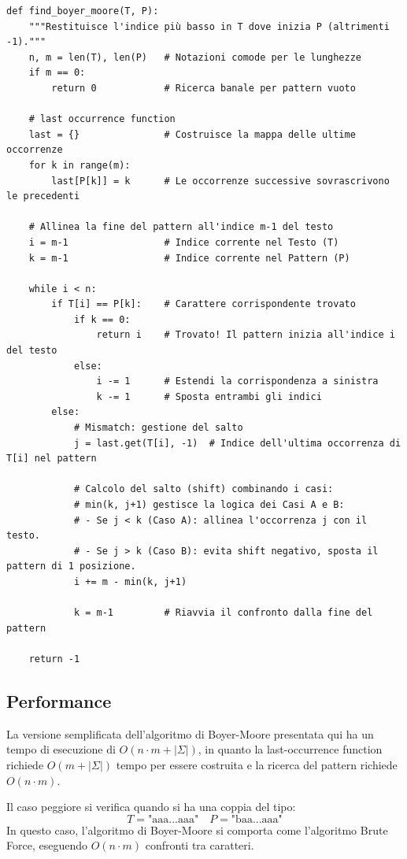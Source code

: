 \clearpage
\begin{lstlisting}
def find_boyer_moore(T, P):
    """Restituisce l'indice più basso in T dove inizia P (altrimenti -1)."""
    n, m = len(T), len(P)   # Notazioni comode per le lunghezze
    if m == 0:
        return 0            # Ricerca banale per pattern vuoto
    
    # last occurrence function
    last = {}               # Costruisce la mappa delle ultime occorrenze
    for k in range(m):
        last[P[k]] = k      # Le occorrenze successive sovrascrivono le precedenti

    # Allinea la fine del pattern all'indice m-1 del testo
    i = m-1                 # Indice corrente nel Testo (T)
    k = m-1                 # Indice corrente nel Pattern (P)
    
    while i < n:
        if T[i] == P[k]:    # Carattere corrispondente trovato
            if k == 0:      
                return i    # Trovato! Il pattern inizia all'indice i del testo
            else:
                i -= 1      # Estendi la corrispondenza a sinistra
                k -= 1      # Sposta entrambi gli indici
        else:
            # Mismatch: gestione del salto
            j = last.get(T[i], -1)  # Indice dell'ultima occorrenza di T[i] nel pattern
            
            # Calcolo del salto (shift) combinando i casi:
            # min(k, j+1) gestisce la logica dei Casi A e B:
            # - Se j < k (Caso A): allinea l'occorrenza j con il testo.
            # - Se j > k (Caso B): evita shift negativo, sposta il pattern di 1 posizione.
            i += m - min(k, j+1)    
            
            k = m-1         # Riavvia il confronto dalla fine del pattern
            
    return -1    
\end{lstlisting}
\vspace{1\baselineskip}


\clearpage
\subsection*{Performance}
La versione semplificata dell'algoritmo di Boyer-Moore presentata qui ha un tempo di esecuzione di $O(n \cdot m + |\Sigma|)$, in quanto la last-occurrence function richiede $O(m + |\Sigma|)$ tempo per essere costruita e la ricerca del pattern richiede $O(n \cdot m)$. 

Il caso peggiore si verifica quando si ha una coppia del tipo: 
$$T = \text{"aaa...aaa"} \quad P = \text{"baa...aaa"}$$
In questo caso, l'algoritmo di Boyer-Moore si comporta come l'algoritmo Brute Force, eseguendo $O(n \cdot m)$ confronti tra caratteri.

